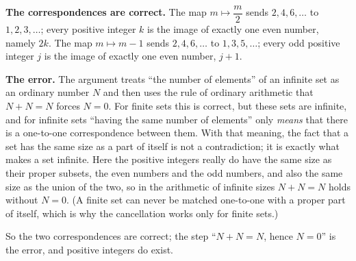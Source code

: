 \textbf{The correspondences are correct.} The map $m\mapsto\dfrac {m}{2}$ sends $2,4,6,\dots$ to $1,2,3,\dots$; every positive integer $k$ is the image of exactly one even number, namely $2k$. The map $m\mapsto m-1$ sends $2,4,6,\dots$ to $1,3,5,\dots$; every odd positive integer $j$ is the image of exactly one even number, $j+1$.

\textbf{The error.} The argument treats ``the number of elements'' of an infinite set as an ordinary number $N$ and then uses the rule of ordinary arithmetic that $N+N=N$ forces $N=0$. For finite sets this is correct, but these sets are infinite, and for infinite sets ``having the same number of elements'' only \emph{means} that there is a one-to-one correspondence between them. With that meaning, the fact that a set has the same size as a part of itself is not a contradiction; it is exactly what makes a set infinite. Here the positive integers really do have the same size as their proper subsets, the even numbers and the odd numbers, and also the same size as the union of the two, so in the arithmetic of infinite sizes $N+N=N$ holds without $N=0$. (A finite set can never be matched one-to-one with a proper part of itself, which is why the cancellation works only for finite sets.)

So the two correspondences are correct; the step ``$N+N=N$, hence $N=0$'' is the error, and positive integers do exist.
